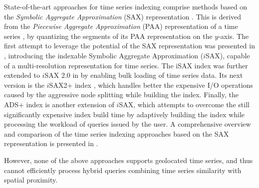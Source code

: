 State-of-the-art approaches for time series indexing comprise methods based on the {\em Symbolic Aggregate Approximation} (SAX) representation \cite{jessica2007dmkd}. This is derived from the {\em Piecewise Aggregate Approximation} (PAA) representation of a time series \cite{keogh2001paa,faloutsos2000vldb}, by quantizing the segments of its PAA representation on the $y$-axis. The first attempt to leverage the potential of the SAX representation was presented in \cite{shieh2008kdd}, introducing the indexable Symbolic Aggregate Approximation ($i$SAX), capable of a multi-resolution representation for time series. The iSAX index was further extended to $i$SAX 2.0 in \cite{camerra2010icdm} by enabling bulk loading of time series data. Its next version is the $i$SAX2+ index \cite{camerra2014kais}, which handles better the expensive I/O operations caused by the aggressive node splitting while building the index. Finally, the ADS+ index \cite{zoumpatianos2014sigmod} is another extension of $i$SAX, which attempts to overcome the still significantly expensive index build time by adaptively building the index while processing the workload of queries issued by the user. A comprehensive overview and comparison of the time series indexing approaches based on the SAX representation is presented in \cite{palpanas2016bigsm}.

However, none of the above approaches supports geolocated time series, and thus cannot efficiently process hybrid queries combining time series similarity with spatial proximity.







